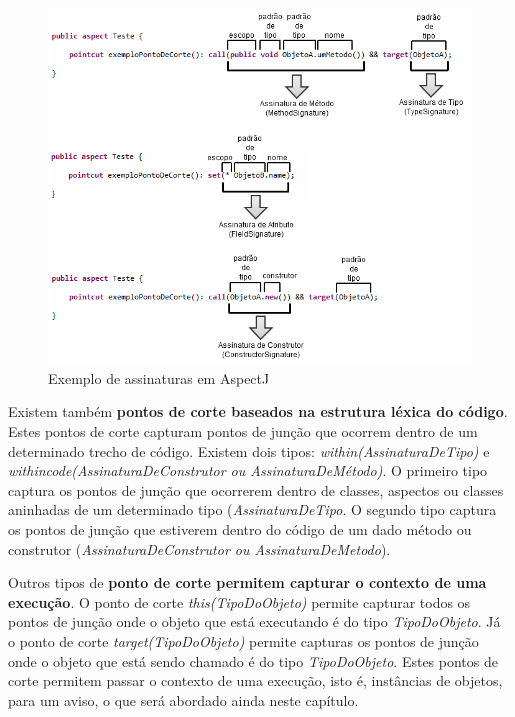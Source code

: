 \begin{landscape}
\begin{figure}
	\centering
	\includegraphics[scale=0.8]{img/signatures.png}
	\caption{Exemplo de assinaturas em AspectJ}\label{fig:signatures}
\end{figure}
\end{landscape}

Existem também \textbf{pontos de corte baseados na estrutura léxica do código}. Estes pontos de corte capturam pontos de junção que ocorrem dentro de
um determinado trecho de código. Existem dois tipos: \textit{within(AssinaturaDeTipo)} e \textit{withincode(AssinaturaDeConstrutor ou
AssinaturaDeMétodo)}. O primeiro tipo captura os pontos de junção que ocorrerem dentro de classes, aspectos ou classes aninhadas de um determinado
tipo (\textit{AssinaturaDeTipo}. O segundo tipo captura os pontos de junção que estiverem dentro do código de um dado método ou construtor
(\textit{AssinaturaDeConstrutor ou AssinaturaDeMetodo}). 

Outros tipos de \textbf{ponto de corte permitem capturar o contexto de uma
execução}. O ponto de corte \textit{this(TipoDoObjeto)} permite capturar todos
os pontos de junção onde o objeto que está executando é do tipo
\textit{TipoDoObjeto}. Já o ponto de corte \textit{target(TipoDoObjeto)} permite
capturas os pontos de junção onde o objeto que está sendo chamado é do tipo
\textit{TipoDoObjeto}. Estes pontos de corte permitem passar o contexto de uma execução, isto é, instâncias de objetos, para um aviso,
o que será abordado ainda neste capítulo. 

